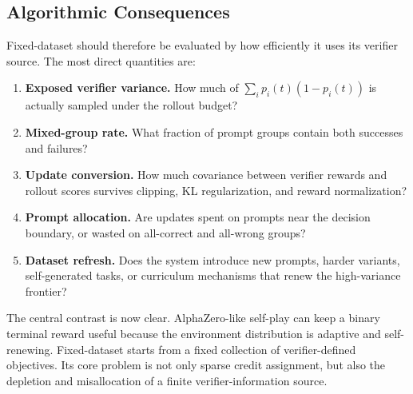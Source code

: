 \subsection{Algorithmic Consequences}

Fixed-dataset \llm{} \rlvr{} should therefore be evaluated by how efficiently it uses its verifier source. The most direct quantities are:
\begin{enumerate}
  \item \textbf{Exposed verifier variance.} How much of $\sum_i p_i(t)(1-p_i(t))$ is actually sampled under the rollout budget?
  \item \textbf{Mixed-group rate.} What fraction of prompt groups contain both successes and failures?
  \item \textbf{Update conversion.} How much covariance between verifier rewards and rollout scores survives clipping, KL regularization, and reward normalization?
  \item \textbf{Prompt allocation.} Are updates spent on prompts near the decision boundary, or wasted on all-correct and all-wrong groups?
  \item \textbf{Dataset refresh.} Does the system introduce new prompts, harder variants, self-generated tasks, or curriculum mechanisms that renew the high-variance frontier?
\end{enumerate}

The central contrast is now clear. AlphaZero-like self-play can keep a binary terminal reward useful because the environment distribution is adaptive and self-renewing. Fixed-dataset \llm{} \rlvr{} starts from a fixed collection of verifier-defined objectives. Its core problem is not only sparse credit assignment, but also the depletion and misallocation of a finite verifier-information source.
